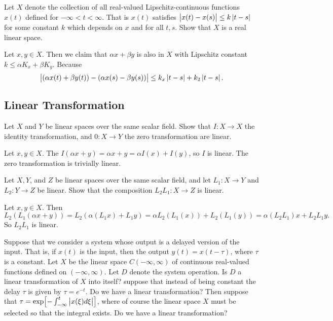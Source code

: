 \begin{problem}
	Let $ X $ denote the collection of all real-valued Lipschitz-continuous functions $ x(t) $ defined for $ -\infty < t < \infty $. That is $ x(t) $ satisfies $ \left|x(t) - x(s)\right| \leq k\left|t-s\right|$ for some constant $ k $ which depends on $ x $ and for all $ t,s $. Show that $ X $ is a real linear space.
\end{problem}
\begin{solution}
	Let $ x,y\in X $. Then we claim that $ \alpha x + \beta y  $ is also in $ X $ with Lipschitz constant $ k \leq \alpha K_x + \beta K_y $. Because
	\[ \left|(\alpha x(t) + \beta y(t)) - (\alpha x(s) - \beta y(s))\right| \leq k_x\left|t-s\right| + k_2\left|t-s\right|. \]
\end{solution}


\subsection{Linear Transformation}


\begin{problem}
	Let $ X $ and $ Y $ be linear spaces over the same scalar field. Show that $ I:X\to X $ the identity transformation, and $ 0:X\to Y $ the zero transformation are linear. 
\end{problem}
\begin{solution}
	Let $ x,y\in X $. The $ I(\alpha x+y) = \alpha x + y = \alpha I(x) + I(y) $, so $ I $ is linear. The zero transformation is trivially linear.
\end{solution}



\begin{problem}
	Let $ X,Y $, and $ Z $ be linear spaces over the same scalar field, and let $ L_1:X\to Y $ and $ L_2:Y\to Z $ be linear. Show that the composition $ L_2L_1:X\to Z $ is linear. 
\end{problem}
\begin{solution}
	Let $ x,y\in X $. Then 
	\[ L_2(L_1(\alpha x+y)) = L_2(\alpha(L_1x) + L_1y) = \alpha L_2(L_1(x)) + L_2(L_1(y)) = \alpha (L_2L_1)x + L_2L_1 y.  \]
	So $ L_2L_1 $ is linear.
\end{solution}


\begin{problem}
	Suppose that we consider a system whose output is a delayed version of the input. That is, if $ x(t) $ is the input, then the output $ y(t) = x(t-\tau) $, where $ \tau $ is a constant. Let $ X $ be the linear space $ C(-\infty,\infty) $ of continuous real-valued functions defined on $ (-\infty,\infty) $. Let $ D $ denote the system operation. Is $ D $ a linear transformation of $ X $ into itself? suppose that instead of being constant the delay $ \tau $ is given by $ \tau = e^{-t} $. Do we have a linear transformation? Then suppose that $ \tau = \exp[-\int_{-\infty}^{t}\left|x(\xi)d\xi\right|] $, where of course the linear space $ X $ must be selected so that the integral exists. Do we have a linear transformation?
\end{problem}

